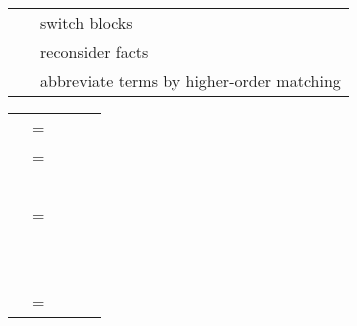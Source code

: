 \begin{isabellebody}
\begin{isamarkuptext}
\begin{tabular}{ll}
    \hyperlink{command.next}{\mbox{\isa{\isacommand{next}}}} & switch blocks \\
    \hyperlink{command.note}{\mbox{\isa{\isacommand{note}}}}~\isa{{\isachardoublequote}a\ {\isacharequal}\ b{\isachardoublequote}} & reconsider facts \\
    \hyperlink{command.let}{\mbox{\isa{\isacommand{let}}}}~\isa{{\isachardoublequote}p\ {\isacharequal}\ t{\isachardoublequote}} & abbreviate terms by higher-order matching \\
  \end{tabular}

  \medskip

  \begin{tabular}{rcl}
    \isa{{\isachardoublequote}theory{\isasymdash}stmt{\isachardoublequote}} & = & \hyperlink{command.theorem}{\mbox{\isa{\isacommand{theorem}}}}~\isa{{\isachardoublequote}name{\isacharcolon}\ props\ proof\ \ {\isacharbar}{\isachardoublequote}}~~\hyperlink{command.definition}{\mbox{\isa{\isacommand{definition}}}}~\isa{{\isachardoublequote}{\isasymdots}\ \ {\isacharbar}\ \ {\isasymdots}{\isachardoublequote}} \\[1ex]
    \isa{{\isachardoublequote}proof{\isachardoublequote}} & = & \isa{{\isachardoublequote}prfx\isactrlsup {\isacharasterisk}{\isachardoublequote}}~\hyperlink{command.proof}{\mbox{\isa{\isacommand{proof}}}}~\isa{{\isachardoublequote}method\isactrlsup {\isacharquery}\ stmt\isactrlsup {\isacharasterisk}{\isachardoublequote}}~\hyperlink{command.qed}{\mbox{\isa{\isacommand{qed}}}}~\isa{{\isachardoublequote}method\isactrlsup {\isacharquery}{\isachardoublequote}} \\
    & \isa{{\isachardoublequote}{\isacharbar}{\isachardoublequote}} & \isa{{\isachardoublequote}prfx\isactrlsup {\isacharasterisk}{\isachardoublequote}}~\hyperlink{command.done}{\mbox{\isa{\isacommand{done}}}} \\[1ex]
    \isa{prfx} & = & \hyperlink{command.apply}{\mbox{\isa{\isacommand{apply}}}}~\isa{method} \\
    & \isa{{\isachardoublequote}{\isacharbar}{\isachardoublequote}} & \hyperlink{command.using}{\mbox{\isa{\isacommand{using}}}}~\isa{{\isachardoublequote}facts{\isachardoublequote}} \\
    & \isa{{\isachardoublequote}{\isacharbar}{\isachardoublequote}} & \hyperlink{command.unfolding}{\mbox{\isa{\isacommand{unfolding}}}}~\isa{{\isachardoublequote}facts{\isachardoublequote}} \\
    \isa{stmt} & = & \hyperlink{command.braceleft}{\mbox{\isa{\isacommand{{\isacharbraceleft}}}}}~\isa{{\isachardoublequote}stmt\isactrlsup {\isacharasterisk}{\isachardoublequote}}~\hyperlink{command.braceright}{\mbox{\isa{\isacommand{{\isacharbraceright}}}}} \\

\end{tabular}
\end{isamarkuptext}
\end{isabellebody}
